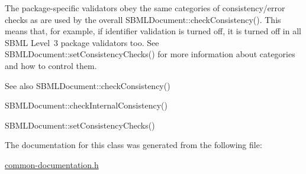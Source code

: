 The package-\/specific validators obey the same categories of consistency/error checks as are used by the overall S\+B\+M\+L\+Document\+::check\+Consistency(). This means that, for example, if identifier validation is turned off, it is turned off in all S\+B\+ML Level~3 package validators too. See S\+B\+M\+L\+Document\+::set\+Consistency\+Checks() for more information about categories and how to control them.

\begin{DoxySeeAlso}{See also}
S\+B\+M\+L\+Document\+::check\+Consistency() 

S\+B\+M\+L\+Document\+::check\+Internal\+Consistency() 

S\+B\+M\+L\+Document\+::set\+Consistency\+Checks() 
\end{DoxySeeAlso}


The documentation for this class was generated from the following file\+:\begin{DoxyCompactItemize}
\item 
\hyperlink{common-documentation_8h}{common-\/documentation.\+h}\end{DoxyCompactItemize}
